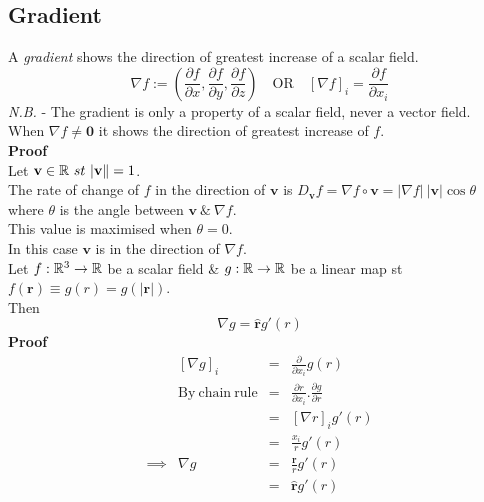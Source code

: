 \documentclass[11pt,a4paper]{article}
\begin{document}
\subsection{Gradient}

A \textit{gradient} shows the direction of greatest increase of a scalar field.\\
$$\nabla f := \left(\frac{\partial f}{\partial x}, \frac{\partial f}{\partial y}, \frac{\partial f}{\partial z}\right)\quad\mathrm{OR}\quad[\nabla f]_i=\frac{\partial f}{\partial x_i}$$
\textit{N.B.} - The gradient is only a property of a scalar field, never a vector field.\\

When $\nabla f\neq\textbf{0}$ it shows the direction of greatest increase of $f$.\\
\textbf{Proof}\\
Let $\textbf{v}\in\real\ st\ |\textbf{v}\|=1$.\\
The rate of change of $f$ in the direction of $\textbf{v}$ is $D_{\textbf{v}}f=\nabla f \circ\textbf{v}=|\nabla f|\ |\textbf{v}|\cos{\theta}$\\
where $\theta$ is the angle between $\textbf{v}\ \&\ \nabla f$.\\
This value is maximised when $\theta=0$.\\
In this case $\textbf{v}$ is in the direction of $\nabla f$.\\

Let $f : \mathbb{R}^3 \to\mathbb{R}$ be a scalar field \& $g : \mathbb{R}\to\mathbb{R}$ be a linear map st $f(\textbf{r})\equiv g(r) = g(|\textbf{r}|)$.\\
Then
$$\nabla g=\hat{\textbf{r}}g'(r)$$
\textbf{Proof}
\[\begin{array}{rrcl}
&[\nabla g]_i &=& \frac{\partial}{\partial x_i}g(r)\\
&\mathrm{By\ chain\ rule}&=&\frac{\partial r}{\partial x_i}.\frac{\partial g}{\partial r}\\
&&=&[\nabla r]_i g'(r)\\
&&=&\frac{x_i}{r}g'(r)\\
\implies&\nabla g &=& \frac{\textbf{r}}{r}g'(r)\\
&&=&\hat{\textbf{r}}g'(r)
\end{array}\]
\end{document}
